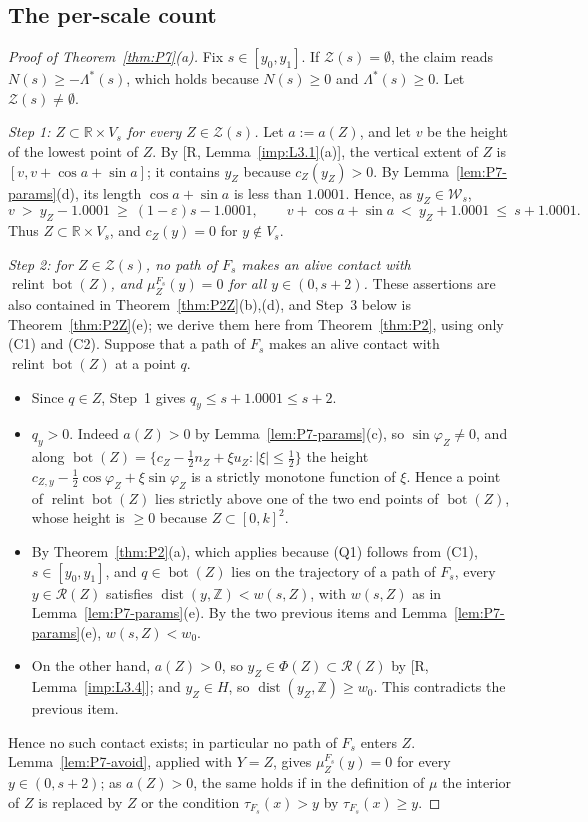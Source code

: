 \documentclass[11pt]{amsart}
\newcommand{\R}{\mathbb R}
\newcommand{\Z}{\mathbb Z}
\newcommand{\eps}{\varepsilon}
\newcommand{\cR}{\mathcal R}
\newcommand{\cZ}{\mathcal Z}
\newcommand{\relint}{\operatorname{relint}}
\newcommand{\Bot}{\operatorname{bot}}
\newcommand{\dist}{\operatorname{dist}}
\newcommand{\Fs}{F_{s}}
\theoremstyle{definition}
\theoremstyle{remark}
\numberwithin{equation}{section}
\begin{document}
\subsection{The per-scale count}\label{ssec:P7-proofA}

\begin{proof}[Proof of Theorem~\ref{thm:P7}(a)]
Fix $s\in[y_0,y_1]$. If $\cZ(s)=\emptyset$, the claim reads $N(s)\ge-\Lambda^*(s)$, which holds because $N(s)\ge0$ and $\Lambda^*(s)\ge0$. Let $\cZ(s)\ne\emptyset$.

\emph{Step 1: $Z\subset\R\times V_s$ for every $Z\in\cZ(s)$.} Let $a:=a(Z)$, and let $v$ be the height of the lowest point of $Z$. By [R, Lemma~\ref{imp:L3.1}(a)], the vertical extent of $Z$ is $[v,v+\cos a+\sin a]$; it contains $y_Z$ because $c_Z(y_Z)>0$. By Lemma~\ref{lem:P7-params}(d), its length $\cos a+\sin a$ is less than $1.0001$. Hence, as $y_Z\in\mathcal W_s$,
\[
v\ >\ y_Z-1.0001\ \ge\ (1-\eps)s-1.0001,\qquad v+\cos a+\sin a\ <\ y_Z+1.0001\ \le\ s+1.0001 .
\]
Thus $Z\subset\R\times V_s$, and $c_Z(y)=0$ for $y\notin V_s$.

\emph{Step 2: for $Z\in\cZ(s)$, no path of $\Fs$ makes an alive contact with $\relint\Bot(Z)$, and $\mu^{\Fs}_Z(y)=0$ for all $y\in(0,s+2)$.} These assertions are also contained in Theorem~\ref{thm:P2Z}(b),(d), and Step~3 below is Theorem~\ref{thm:P2Z}(e); we derive them here from Theorem~\ref{thm:P2}, using only (C1) and (C2). Suppose that a path of $\Fs$ makes an alive contact with $\relint\Bot(Z)$ at a point $q$.
\begin{itemize}
\item Since $q\in Z$, Step~1 gives $q_y\le s+1.0001\le s+2$.
\item $q_y>0$. Indeed $a(Z)>0$ by Lemma~\ref{lem:P7-params}(c), so $\sin\varphi_Z\ne0$, and along $\Bot(Z)=\{c_Z-\frac12n_Z+\xi u_Z:|\xi|\le\frac12\}$ the height $c_{Z,y}-\frac12\cos\varphi_Z+\xi\sin\varphi_Z$ is a strictly monotone function of $\xi$. Hence a point of $\relint\Bot(Z)$ lies strictly above one of the two end points of $\Bot(Z)$, whose height is $\ge0$ because $Z\subset[0,k]^2$.
\item By Theorem~\ref{thm:P2}(a), which applies because (Q1) follows from (C1), $s\in[y_0,y_1]$, and $q\in\Bot(Z)$ lies on the trajectory of a path of $\Fs$, every $y\in\cR(Z)$ satisfies $\dist(y,\Z)<w(s,Z)$, with $w(s,Z)$ as in Lemma~\ref{lem:P7-params}(e). By the two previous items and Lemma~\ref{lem:P7-params}(e), $w(s,Z)<w_0$.
\item On the other hand, $a(Z)>0$, so $y_Z\in\Phi(Z)\subset\cR(Z)$ by [R, Lemma~\ref{imp:L3.4}]; and $y_Z\in H$, so $\dist(y_Z,\Z)\ge w_0$. This contradicts the previous item.
\end{itemize}
Hence no such contact exists; in particular no path of $\Fs$ enters $Z$. Lemma~\ref{lem:P7-avoid}, applied with $Y=Z$, gives $\mu^{\Fs}_Z(y)=0$ for every $y\in(0,s+2)$; as $a(Z)>0$, the same holds if in the definition of $\mu$ the interior of $Z$ is replaced by $Z$ or the condition $\tau_{\Fs}(x)>y$ by $\tau_{\Fs}(x)\ge y$.


\end{proof}
\end{document}
